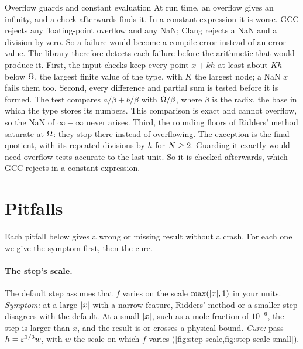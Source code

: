 \begin{sidebar}[label=sb:constexpr-overflow]{Overflow guards and constant evaluation}
At run time, an overflow gives an infinity, and a check afterwards finds it. In a constant expression it is worse.
GCC rejects any floating-point overflow and any NaN; Clang rejects a NaN and a division by zero. So a failure would
become a compile error instead of an error value. The library therefore detects each failure before the arithmetic
that would produce it. First, the input checks keep every point $x + k h$ at least about $K h$ below $\Omega$, the
largest finite value of the type, with $K$ the largest node; a NaN $x$ fails them too. Second, every difference and
partial sum is tested before it is formed. The test compares $a/\beta + b/\beta$ with $\Omega/\beta$, where $\beta$ is
the radix, the base in which the type stores its numbers. This comparison is exact and cannot overflow, so the NaN of
$\infty - \infty$ never arises. Third, the rounding floors of Ridders' method saturate at $\Omega$: they stop there
instead of overflowing. The exception is the final quotient, with its repeated divisions by $h$ for $N \ge 2$.
Guarding it exactly would need overflow tests accurate to the last unit. So it is checked afterwards, which GCC
rejects in a constant expression.
\end{sidebar}

\section{Pitfalls}\label{sec:using-pitfalls}

Each pitfall below gives a wrong or missing result without a crash. For each one we give the symptom first, then the
cure.

\paragraph{The step's scale.} The default step assumes that $f$ varies on the scale $\max(\lvert x \rvert, 1)$ in your units.
\emph{Symptom:} at a large $\lvert x \rvert$ with a narrow feature, Ridders' method or a smaller step disagrees with the
default. At a small $\lvert x \rvert$, such as a mole fraction of $10^{-6}$, the step is larger than $x$, and the result is
 or crosses a physical bound. \emph{Cure:} pass $h = \varepsilon^{1/3} w$, with $w$ the scale on which
$f$ varies (\cref{fig:step-scale,fig:step-scale-small}).

